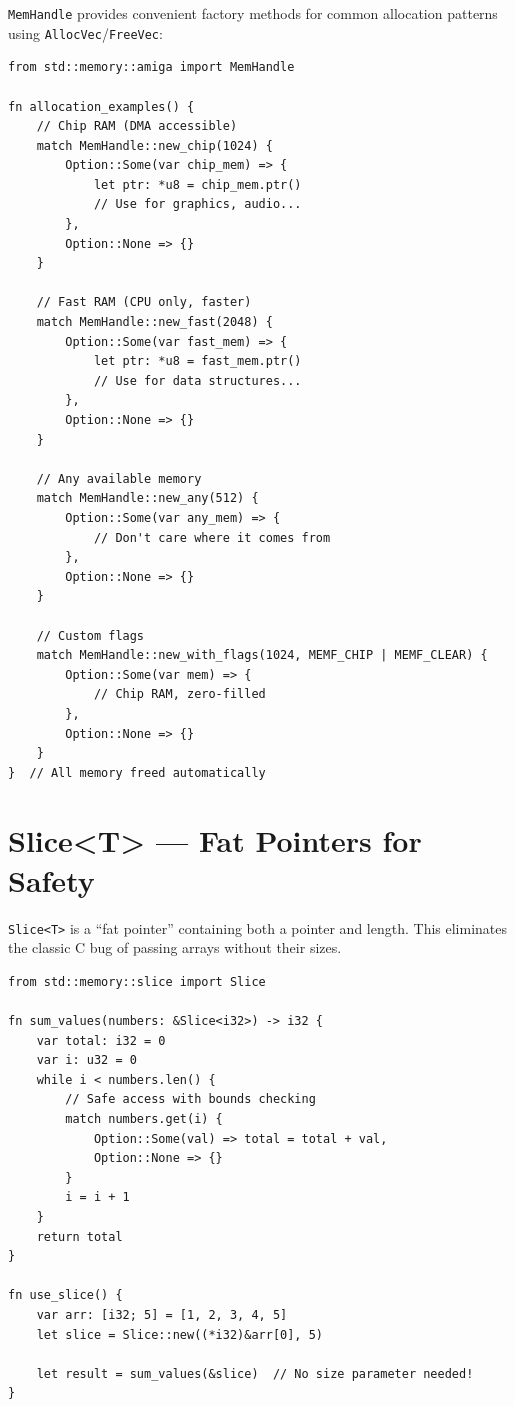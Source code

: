 \texttt{MemHandle} provides convenient factory methods for common allocation patterns using \texttt{AllocVec}/\texttt{FreeVec}:

\begin{lstlisting}
from std::memory::amiga import MemHandle

fn allocation_examples() {
    // Chip RAM (DMA accessible)
    match MemHandle::new_chip(1024) {
        Option::Some(var chip_mem) => {
            let ptr: *u8 = chip_mem.ptr()
            // Use for graphics, audio...
        },
        Option::None => {}
    }

    // Fast RAM (CPU only, faster)
    match MemHandle::new_fast(2048) {
        Option::Some(var fast_mem) => {
            let ptr: *u8 = fast_mem.ptr()
            // Use for data structures...
        },
        Option::None => {}
    }

    // Any available memory
    match MemHandle::new_any(512) {
        Option::Some(var any_mem) => {
            // Don't care where it comes from
        },
        Option::None => {}
    }

    // Custom flags
    match MemHandle::new_with_flags(1024, MEMF_CHIP | MEMF_CLEAR) {
        Option::Some(var mem) => {
            // Chip RAM, zero-filled
        },
        Option::None => {}
    }
}  // All memory freed automatically
\end{lstlisting}

\section{Slice<T> --- Fat Pointers for Safety}
\label{sec:slice}

\texttt{Slice<T>} is a ``fat pointer'' containing both a pointer and length. This eliminates the classic C bug of passing arrays without their sizes.

\begin{lstlisting}
from std::memory::slice import Slice

fn sum_values(numbers: &Slice<i32>) -> i32 {
    var total: i32 = 0
    var i: u32 = 0
    while i < numbers.len() {
        // Safe access with bounds checking
        match numbers.get(i) {
            Option::Some(val) => total = total + val,
            Option::None => {}
        }
        i = i + 1
    }
    return total
}

fn use_slice() {
    var arr: [i32; 5] = [1, 2, 3, 4, 5]
    let slice = Slice::new((*i32)&arr[0], 5)

    let result = sum_values(&slice)  // No size parameter needed!
}
\end{lstlisting}

